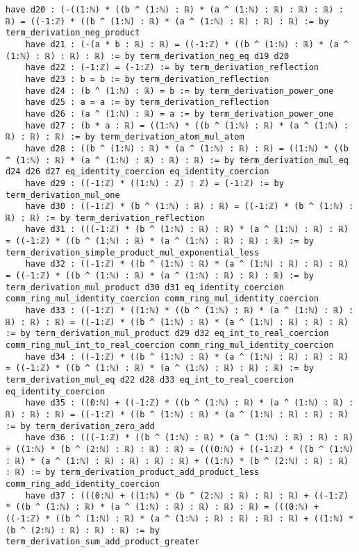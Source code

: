 \documentclass{article}
\begin{document}
\begin{tcolorbox}[colback=white!10, width=\linewidth]
\begin{lstlisting}[language=Lean4]
    have d20 : (-((1:ℕ) * ((b ^ (1:ℕ) : ℝ) * (a ^ (1:ℕ) : ℝ) : ℝ) : ℝ) : ℝ) = ((-1:ℤ) * ((b ^ (1:ℕ) : ℝ) * (a ^ (1:ℕ) : ℝ) : ℝ) : ℝ) := by term_derivation_neg_product
    have d21 : (-(a * b : ℝ) : ℝ) = ((-1:ℤ) * ((b ^ (1:ℕ) : ℝ) * (a ^ (1:ℕ) : ℝ) : ℝ) : ℝ) := by term_derivation_neg_eq d19 d20
    have d22 : (-1:ℤ) = (-1:ℤ) := by term_derivation_reflection
    have d23 : b = b := by term_derivation_reflection
    have d24 : (b ^ (1:ℕ) : ℝ) = b := by term_derivation_power_one
    have d25 : a = a := by term_derivation_reflection
    have d26 : (a ^ (1:ℕ) : ℝ) = a := by term_derivation_power_one
    have d27 : (b * a : ℝ) = ((1:ℕ) * ((b ^ (1:ℕ) : ℝ) * (a ^ (1:ℕ) : ℝ) : ℝ) : ℝ) := by term_derivation_atom_mul_atom
    have d28 : ((b ^ (1:ℕ) : ℝ) * (a ^ (1:ℕ) : ℝ) : ℝ) = ((1:ℕ) * ((b ^ (1:ℕ) : ℝ) * (a ^ (1:ℕ) : ℝ) : ℝ) : ℝ) := by term_derivation_mul_eq d24 d26 d27 eq_identity_coercion eq_identity_coercion
    have d29 : ((-1:ℤ) * ((1:ℕ) : ℤ) : ℤ) = (-1:ℤ) := by term_derivation_mul_one
    have d30 : ((-1:ℤ) * (b ^ (1:ℕ) : ℝ) : ℝ) = ((-1:ℤ) * (b ^ (1:ℕ) : ℝ) : ℝ) := by term_derivation_reflection
    have d31 : (((-1:ℤ) * (b ^ (1:ℕ) : ℝ) : ℝ) * (a ^ (1:ℕ) : ℝ) : ℝ) = ((-1:ℤ) * ((b ^ (1:ℕ) : ℝ) * (a ^ (1:ℕ) : ℝ) : ℝ) : ℝ) := by term_derivation_simple_product_mul_exponential_less
    have d32 : ((-1:ℤ) * ((b ^ (1:ℕ) : ℝ) * (a ^ (1:ℕ) : ℝ) : ℝ) : ℝ) = ((-1:ℤ) * ((b ^ (1:ℕ) : ℝ) * (a ^ (1:ℕ) : ℝ) : ℝ) : ℝ) := by term_derivation_mul_product d30 d31 eq_identity_coercion comm_ring_mul_identity_coercion comm_ring_mul_identity_coercion
    have d33 : ((-1:ℤ) * ((1:ℕ) * ((b ^ (1:ℕ) : ℝ) * (a ^ (1:ℕ) : ℝ) : ℝ) : ℝ) : ℝ) = ((-1:ℤ) * ((b ^ (1:ℕ) : ℝ) * (a ^ (1:ℕ) : ℝ) : ℝ) : ℝ) := by term_derivation_mul_product d29 d32 eq_int_to_real_coercion comm_ring_mul_int_to_real_coercion comm_ring_mul_identity_coercion
    have d34 : ((-1:ℤ) * ((b ^ (1:ℕ) : ℝ) * (a ^ (1:ℕ) : ℝ) : ℝ) : ℝ) = ((-1:ℤ) * ((b ^ (1:ℕ) : ℝ) * (a ^ (1:ℕ) : ℝ) : ℝ) : ℝ) := by term_derivation_mul_eq d22 d28 d33 eq_int_to_real_coercion eq_identity_coercion
    have d35 : ((0:ℕ) + ((-1:ℤ) * ((b ^ (1:ℕ) : ℝ) * (a ^ (1:ℕ) : ℝ) : ℝ) : ℝ) : ℝ) = ((-1:ℤ) * ((b ^ (1:ℕ) : ℝ) * (a ^ (1:ℕ) : ℝ) : ℝ) : ℝ) := by term_derivation_zero_add
    have d36 : (((-1:ℤ) * ((b ^ (1:ℕ) : ℝ) * (a ^ (1:ℕ) : ℝ) : ℝ) : ℝ) + ((1:ℕ) * (b ^ (2:ℕ) : ℝ) : ℝ) : ℝ) = (((0:ℕ) + ((-1:ℤ) * ((b ^ (1:ℕ) : ℝ) * (a ^ (1:ℕ) : ℝ) : ℝ) : ℝ) : ℝ) + ((1:ℕ) * (b ^ (2:ℕ) : ℝ) : ℝ) : ℝ) := by term_derivation_product_add_product_less comm_ring_add_identity_coercion
    have d37 : (((0:ℕ) + ((1:ℕ) * (b ^ (2:ℕ) : ℝ) : ℝ) : ℝ) + ((-1:ℤ) * ((b ^ (1:ℕ) : ℝ) * (a ^ (1:ℕ) : ℝ) : ℝ) : ℝ) : ℝ) = (((0:ℕ) + ((-1:ℤ) * ((b ^ (1:ℕ) : ℝ) * (a ^ (1:ℕ) : ℝ) : ℝ) : ℝ) : ℝ) + ((1:ℕ) * (b ^ (2:ℕ) : ℝ) : ℝ) : ℝ) := by term_derivation_sum_add_product_greater

\end{lstlisting}
\end{tcolorbox}
\end{document}
